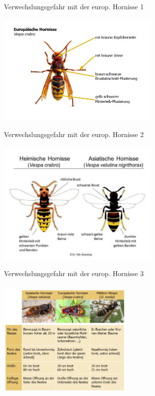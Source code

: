 \documentclass[aspectratio=169]{beamer}
\begin{document}
\begin{frame}{Verwechslungsgefahr mit der europ. Hornisse 1}
	\framesubtitle{} 
	\begin{center}	
		\includegraphics[width=0.6\textwidth]{figures/Europaeische_Hornisse.JPG}
	\end{center}
	\end{frame}

\begin{frame}{Verwechslungsgefahr mit der europ. Hornisse 2}
	\framesubtitle{} 
	\begin{center}	
		\includegraphics[width=0.6\textwidth]{figures/Boecking-Otto-cropped-195449.jpeg}
	\end{center}
	\end{frame}

\begin{frame}{Verwechslungsgefahr mit der europ. Hornisse 3}
	\framesubtitle{} 
	\begin{center}	
		\includegraphics[width=0.5\textwidth]{figures/Vergleich.JPG}
	\end{center}
	\end{frame}
\end{document}
